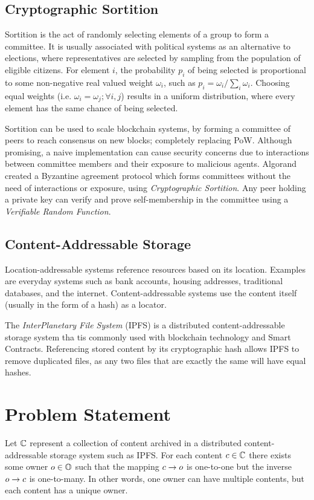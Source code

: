 \documentclass[conference]{IEEEtran}
\begin{document}
\subsection{Cryptographic Sortition}
Sortition is the act of randomly selecting elements of a group to form a committee. It is usually associated with political systems as an alternative to elections, where representatives are selected by sampling from the population of eligible citizens. For element $i$, the probability $p_i$ of being selected is proportional to some non-negative real valued weight $\omega_i$, such as $p_i = \omega_i/\sum_i\omega_i$. Choosing equal weights (i.e. $\omega_i = \omega_j; \forall i,j$) results in a uniform distribution, where every element has the same chance of being selected.

Sortition can be used to scale blockchain systems, by forming a committee of peers to reach consensus on new blocks; completely replacing PoW. Although promising, a naive implementation can cause security concerns due to interactions between committee members and their exposure to malicious agents. Algorand created a Byzantine agreement protocol which forms committees without the need of interactions or exposure, using \emph{Cryptographic Sortition}. Any peer holding a private key can verify and prove self-membership in the committee using a \emph{Verifiable Random Function}.

\subsection{Content-Addressable Storage}
Location-addressable systems reference resources based on its location. Examples are everyday systems such as bank accounts, housing addresses, traditional databases, and the internet. Content-addressable systems use the content itself (usually in the form of a hash) as a locator.

The \emph{InterPlanetary File System} (IPFS) is a distributed content-addressable storage system tha tis commonly used with blockchain technology and Smart Contracts. Referencing stored content by its cryptographic hash allows IPFS to remove duplicated files, as any two files that are exactly the same will have equal hashes.
\section{Problem Statement}
Let ${{\mathbb{C}}}$ represent a collection of content archived in a distributed content-addressable storage system such as IPFS. For each content ${c} \in {{\mathbb{C}}}$ there exists some owner ${o} \in {{\mathbb{O}}}$ such that the mapping ${c} \to {o}$ is one-to-one but the inverse ${o} \to {c}$ is one-to-many. In other words, one owner can have multiple contents, but each content has a unique owner. 
\end{document}
